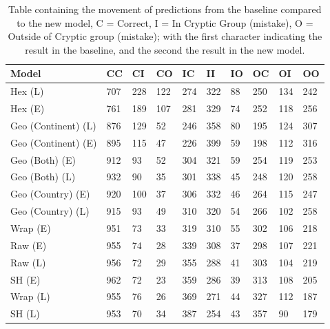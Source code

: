 \begin{table}[h!]
\centering
\caption{Table containing the movement of predictions from the baseline compared to the new model, C = Correct, I = In Cryptic Group (mistake), O = Outside of Cryptic group (mistake); with the first character indicating the result in the baseline, and the second the result in the new model.}
\begin{tabular}{p{1.5cm} p{1cm}p{1cm}p{1cm}p{1cm}p{1cm}p{1cm}p{1cm}p{1cm}p{1cm}}
\hline
\textbf{Model} & \textbf{CC} & \textbf{CI} & \textbf{CO} & \textbf{IC} & \textbf{II} & \textbf{IO} & \textbf{OC} & \textbf{OI} & \textbf{OO}\\
\hline
Hex (L) & 707 & 228 & 122 & 274 & 322 & 88 & 250 & 134 & 242\\
Hex (E) & 761 & 189 & 107 & 281 & 329 & 74 & 252 & 118 & 256\\
Geo (Continent) (L) & 876 & 129 & 52 & 246 & 358 & 80 & 195 & 124 & 307\\
Geo (Continent) (E) & 895 & 115 & 47 & 226 & 399 & 59 & 198 & 112 & 316\\
Geo (Both) (E) & 912 & 93 & 52 & 304 & 321 & 59 & 254 & 119 & 253\\
Geo (Both) (L) & 932 & 90 & 35 & 301 & 338 & 45 & 248 & 120 & 258\\
Geo (Country) (E) & 920 & 100 & 37 & 306 & 332 & 46 & 264 & 115 & 247\\
Geo (Country) (L) & 915 & 93 & 49 & 310 & 320 & 54 & 266 & 102 & 258\\
Wrap (E) & 951 & 73 & 33 & 319 & 310 & 55 & 302 & 106 & 218\\
Raw (E) & 955 & 74 & 28 & 339 & 308 & 37 & 298 & 107 & 221\\
Raw (L) & 956 & 72 & 29 & 355 & 288 & 41 & 303 & 104 & 219\\
SH (E) & 962 & 72 & 23 & 359 & 286 & 39 & 313 & 108 & 205\\
Wrap (L) & 955 & 76 & 26 & 369 & 271 & 44 & 327 & 112 & 187\\
SH (L) & 953 & 70 & 34 & 387 & 254 & 43 & 357 & 90 & 179\\
\end{tabular}
\label{tab:comparison_baseline}
\end{table}